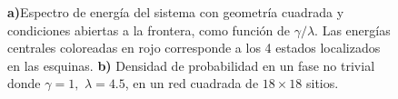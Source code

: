 \begin{figure}[h!]
\begin{subfigure}[b!]{0.56 \textwidth}
     \end{subfigure}\hspace*{1em} \vspace*{-0.5em}
        \caption{\textbf{a)}Espectro de energía del sistema con geometría cuadrada y condiciones abiertas a la frontera, como función de $\gamma/\lambda$. Las energías centrales coloreadas en rojo corresponde a los 4 estados localizados en las esquinas. \textbf{b)} Densidad de probabilidad en un fase no trivial donde $\gamma = 1,\, \, \lambda = 4.5$, en un red cuadrada de $18\times18$ sitios.}
    \label{fig:Pram_Proy_cuadrado}
\end{figure}